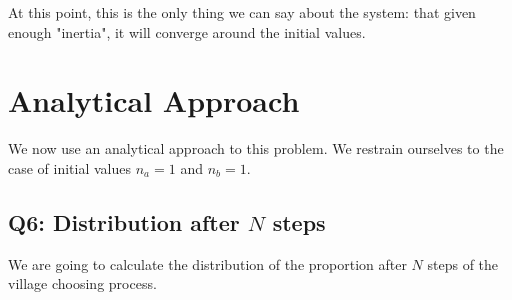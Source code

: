 \documentclass{beamer}
\begin{document}
At this point, this is the only thing we can say about the system: that given enough "inertia", it will converge around the initial values.


\section{Analytical Approach}
\label{sec:analytical_approach}
We now use an analytical approach to this problem. We restrain ourselves to the case of initial values $n_a=1$ and $n_b=1$.

\subsection*{Q6: Distribution after $N$ steps}
\label{sub:subsection*_name}
We are going to calculate the distribution of the proportion after $N$ steps of the village choosing process. 
\end{document}
